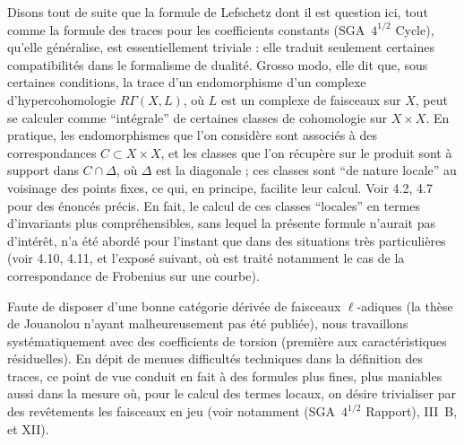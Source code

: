 \documentclass[11pt]{article}
\begin{document}
Disons tout de suite que la formule de Lefschetz dont il est question ici, tout comme la formule des traces pour les coefficients constants (SGA~$4^{1/2}$ Cycle), qu'elle généralise, est essentiellement triviale : elle traduit seulement certaines compatibilités dans le formalisme de dualité. Grosso modo, elle dit que, sous certaines conditions, la trace d'un endomorphisme d'un complexe d'hypercohomologie $R\Gamma(X,L)$, où $L$ est un complexe de faisceaux sur $X$, peut se calculer comme ``intégrale'' de certaines classes de cohomologie sur $X \times X$. En pratique, les endomorphismes que l'on considère sont associés à des correspondances $C \subset X \times X$, et les classes que l'on récupère sur le produit sont à support dans $C \cap \Delta$, où $\Delta$ est la diagonale ; ces classes sont ``de nature locale'' au voisinage des points fixes, ce qui, en principe, facilite leur calcul. Voir 4.2, 4.7 pour des énoncés précis. En fait, le calcul de ces classes ``locales'' en termes d'invariants plus compréhensibles, sans lequel la présente formule n'aurait pas d'intérêt, n'a été abordé pour l'instant que dans des situations très particulières (voir 4.10, 4.11, et l'exposé suivant, où est traité notamment le cas de la correspondance de Frobenius sur une courbe).

Faute de disposer d'une bonne catégorie dérivée de faisceaux $\ell$-adiques (la thèse de Jouanolou n'ayant malheureusement pas été publiée), nous travaillons systématiquement avec des coefficients de torsion (première aux caractéristiques résiduelles). En dépit de menues difficultés techniques dans la définition des traces, ce point de vue conduit en fait à des formules plus fines, plus maniables aussi dans la mesure où, pour le calcul des termes locaux, on désire trivialiser par des revêtements les faisceaux en jeu (voir notamment (SGA~$4^{1/2}$ Rapport), III~B, et XII).
\end{document}
